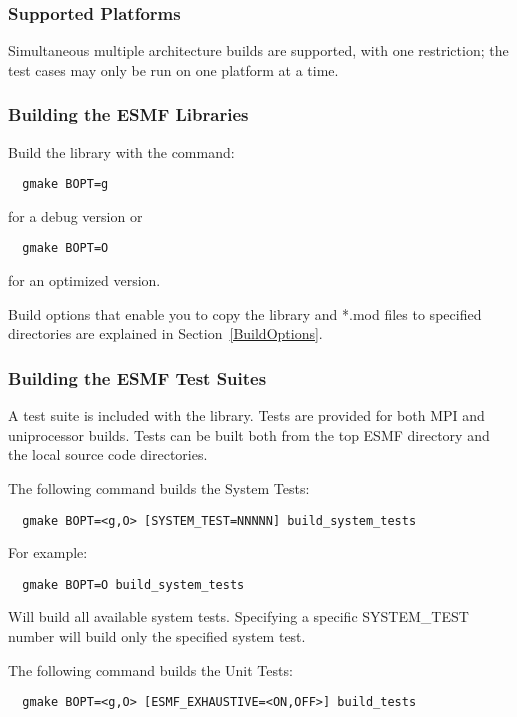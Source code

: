 \subsubsection{Supported Platforms}




Simultaneous multiple architecture builds are supported, with
one restriction; the test cases may only be run on one platform at a time. 

\subsubsection{Building the ESMF Libraries}
\label{BuildESMF}

Build the library with the command:
\begin{verbatim}
  gmake BOPT=g  
\end{verbatim}
  for a debug version or
\begin{verbatim}
  gmake BOPT=O  
\end{verbatim}
  for an optimized version.

Build options that enable you to copy the library and *.mod files to
specified directories are explained in Section~\ref{BuildOptions}. 

\subsubsection{Building the ESMF Test Suites}
\label{BuildTestSuite}
A test suite is included with the library. Tests are provided for both MPI
and uniprocessor builds. Tests can be built both from the top ESMF directory and
the local source code directories.

\noindent The following command builds the System Tests:
\begin{verbatim}
  gmake BOPT=<g,O> [SYSTEM_TEST=NNNNN] build_system_tests
\end{verbatim}

For example:
\begin{verbatim}
  gmake BOPT=O build_system_tests
\end{verbatim}
Will build all available system tests. Specifying a specific SYSTEM\_TEST number will build only the specified system test.

\noindent The following command builds the Unit Tests:
\begin{verbatim}
  gmake BOPT=<g,O> [ESMF_EXHAUSTIVE=<ON,OFF>] build_tests
\end{verbatim}

